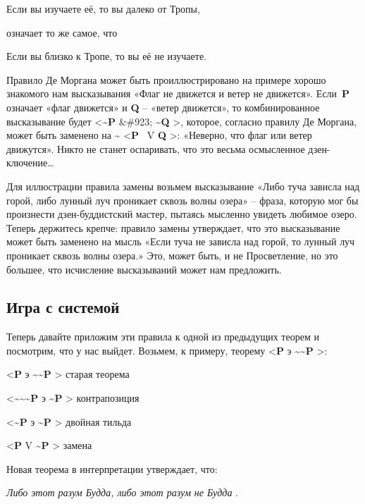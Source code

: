 \documentclass[../main.tex]{subfiles}
\begin{document}
Если вы изучаете её, то вы далеко от Тропы,

означает то же самое, что

Если вы близко к Тропе, то вы её не изучаете.

Правило Де Моргана может быть проиллюстрировано на примере хорошо знакомого нам высказывания «Флаг не движется и ветер не движется». Если~\textbf{P} означает «флаг движется» и \textbf{Q} \--- «ветер движется», то комбинированное высказывание будет \textless{}\textbf{\textasciitilde P} \&\#923; \textbf{\textasciitilde Q} \textgreater, которое, согласно правилу Де Моргана, может быть заменено на \textbf{\textasciitilde{}} \textless{}\textbf{P} ~V \textbf{Q} \textgreater: «Неверно, что флаг или ветер движутся». Никто не станет оспаривать, что это весьма осмысленное дзен-ключение\ldots{}

Для иллюстрации правила замены возьмем высказывание «Либо туча зависла над горой, либо лунный луч проникает сквозь волны озера» \--- фраза, которую мог бы произнести дзен-буддистский мастер, пытаясь мысленно увидеть любимое озеро. Теперь держитесь крепче: правило замены утверждает, что это высказывание может быть заменено на мысль «Если туча не зависла над горой, то лунный луч проникает сквозь волны озера.» Это, может быть, и не Просветление, но это большее, что исчисление высказываний может нам предложить.


\subsection{Игра с системой}

Теперь давайте приложим эти правила к одной из предыдущих теорем и посмотрим, что у нас выйдет. Возьмем, к примеру, теорему \textless{}\textbf{P} э \textbf{\textasciitilde\textasciitilde P} \textgreater:

\textless{}\textbf{P} э \textbf{\textasciitilde\textasciitilde P} \textgreater{} старая теорема

\textless{}\textbf{\textasciitilde\textasciitilde\textasciitilde P} э \textbf{\textasciitilde P} \textgreater{} контрапозиция

\textless{}\textbf{\textasciitilde P} э \textbf{\textasciitilde P} \textgreater{} двойная тильда

\textless{}\textbf{P} V \textbf{\textasciitilde P} \textgreater{} замена

Новая теорема в интерпретации утверждает, что:

\emph{Либо этот разум Будда, либо этот разум не Будда} .
\end{document}
